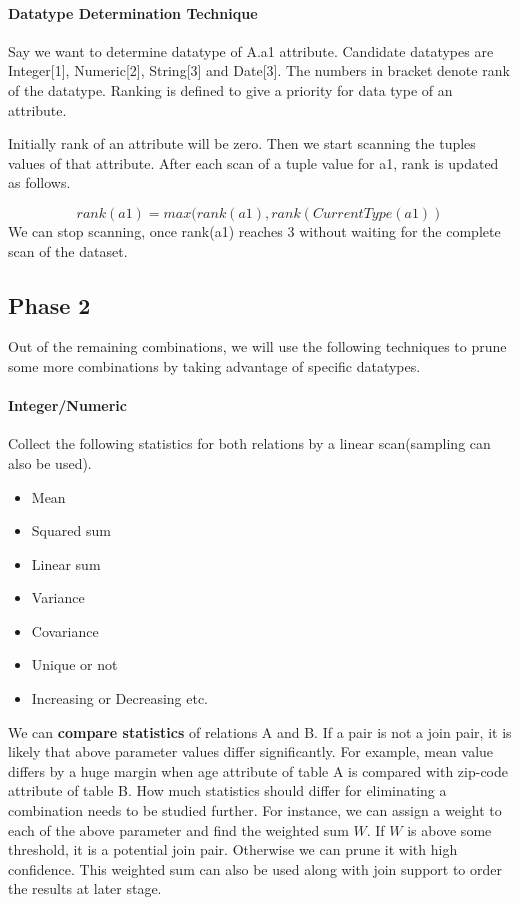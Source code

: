 \documentclass{article}
\begin{document}
\paragraph{Datatype Determination Technique}
Say we want to determine datatype of A.a1 attribute. Candidate datatypes are Integer[1], Numeric[2], String[3] and Date[3]. The numbers in bracket denote rank of the datatype. Ranking is defined to give a priority for data type of an attribute. 

Initially rank of an attribute will be zero. Then we start scanning the tuples values of that attribute. After each scan of a tuple value for a1, rank is updated as follows.

\[rank(a1) = max(rank(a1), rank(CurrentType(a1))\]
We can stop scanning, once rank(a1) reaches 3 without waiting for the complete scan of the dataset.

\subsection{Phase 2}
Out of the remaining combinations, we will use the following techniques to prune some more combinations by taking advantage of specific datatypes.

\paragraph{Integer/Numeric}

Collect the following statistics for both relations by a linear scan(sampling can also be used). 
\begin{itemize}
\item Mean
\item Squared sum
\item Linear sum
\item Variance
\item Covariance 
\item Unique or not
\item Increasing or Decreasing etc.
\end{itemize}


    We can \textbf{compare statistics} of relations A and B. If a pair is not a join pair, it is likely that above parameter values differ significantly. For example, mean value differs by a huge margin when age attribute of table A is compared with zip-code attribute of table B. How much statistics should differ for eliminating a combination needs to be studied further. For instance, we can assign a weight to each of the above parameter and find the weighted sum $W$. If $W$ is above some threshold, it is a potential join pair. Otherwise we can prune it with high confidence. This weighted sum can also be used along with join support to order the results at later stage.
    
\end{document}

